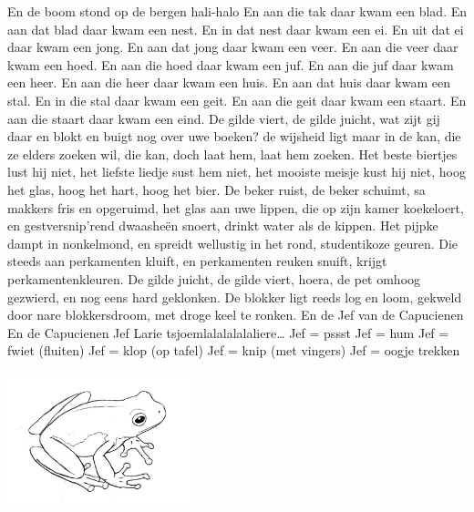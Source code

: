 \documentclass{article}
\begin{document}
\begin{songs}{}
En de boom stond op de bergen hali-halo 
\endchorus
\beginverse
En aan die tak daar kwam een blad.
\endverse
\beginverse
En aan dat blad daar kwam een nest. 
\endverse
\beginverse
En in dat nest daar kwam een ei.
\endverse
\beginverse
En uit dat ei daar kwam een jong. 
\endverse
\beginverse
En aan dat jong daar kwam een veer. 
\endverse
\beginverse
En aan die veer daar kwam een hoed. 
\endverse
\beginverse
En aan die hoed daar kwam een juf. 
\endverse
\beginverse
En aan die juf daar kwam een heer. 
\endverse
\beginverse
En aan die heer daar kwam een huis.
\endverse
\beginverse
En aan dat huis daar kwam een stal.
\endverse
\beginverse
En in die stal daar kwam een geit.
\endverse
\beginverse
En aan die geit daar kwam een staart. 
\endverse
\beginverse
En aan die staart daar kwam een eind. 
\endverse
\endsong
{}
\beginverse
De gilde viert, de gilde juicht,
wat zijt gij daar en blokt en buigt
nog over uwe boeken?
de wijsheid ligt maar in de kan,
die ze elders zoeken wil, die kan,
doch laat hem, laat hem zoeken.
\endverse
\beginchorus
Het beste biertjes lust hij niet,
het liefste liedje sust hem niet,
het mooiste meisje kust hij niet,
hoog het glas, hoog het hart, hoog het bier.
\endchorus
\beginverse
De beker ruist, de beker schuimt,
sa makkers fris en opgeruimd,
het glas aan uwe lippen,
die op zijn kamer koekeloert,
en gestversnip’rend dwaasheën snoert,
drinkt water als de kippen.
\endverse
\beginverse
Het pijpke dampt in nonkelmond,
en spreidt wellustig in het rond,
studentikoze geuren.
Die steeds aan perkamenten kluift,
en perkamenten reuken snuift,
krijgt perkamentenkleuren.
\endverse
\beginverse
De gilde juicht, de gilde viert,
hoera, de pet omhoog gezwierd,
en nog eens hard geklonken.
De blokker ligt reeds log en loom,
gekweld door nare blokkersdroom,
met droge keel te ronken.
\endverse
\endsong
{}
\beginverse
En de Jef van de Capucienen 
En de Capucienen Jef		
Larie tsjoemlalalalalaliere… 
\endverse
\beginverse*
Jef = pssst
Jef = hum
Jef = fwiet (fluiten)
Jef = klop (op tafel)
Jef = knip (met vingers)
Jef = oogje trekken
\endverse
\endsong
\begin{intersong}
    \includegraphics[width=0.4\textwidth]{dekikker}

\end{intersong}
\end{songs}
\end{document}
